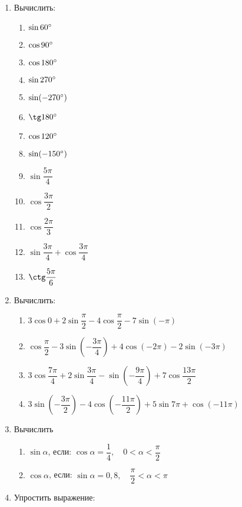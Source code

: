 \documentclass[12pt, a4paper]{article}
\begin{document}
\begin{enumerate}
		\item Вычислить:
		\begin{multicols}{4}
			\begin{enumerate}[label=\asbuk*)]
				\item $\sin 60\degree$
				\item $\cos 90\degree$
				\item $\cos 180\degree$
				\item $\sin 270\degree$
				\item $\sin (-270\degree)$
				\item $\tg 180\degree$
				\item $\cos 120\degree$
				\item $\sin (-150\degree)$
				\item $\sin \dfrac{5\pi}{4}$
				\item $\cos \dfrac{3\pi}{2}$
				\item $\cos \dfrac{2\pi}{3}$
				\item $\sin \dfrac{3\pi}{4} + \cos \dfrac{3\pi}{4}$
				\item $\ctg \dfrac{5\pi}{6}$
			\end{enumerate}
		\end{multicols}
		\item Вычислить:
		\begin{enumerate}[label=\asbuk*)]
			\item $3\cos0+2\sin\dfrac{\pi}{2}-4\cos\dfrac{\pi}{2}-7\sin(-\pi)$
			\item $\cos\dfrac{\pi}{2}-3\sin\left(-\dfrac{3\pi}{4}\right)+4\cos(-2\pi)-2\sin(-3\pi)$
			\item $3\cos\dfrac{7\pi}{4}+2\sin\dfrac{3\pi}{4}-\sin\left(-\dfrac{9\pi}{4}\right)+7\cos\dfrac{13\pi}{2}$
			\item $3\sin\left(-\dfrac{3\pi}{2}\right)-4\cos\left(-\dfrac{11\pi}{2}\right)+5\sin7\pi+\cos(-11\pi)$
		\end{enumerate}
		\item Вычислить
		\begin{multicols}{2}
			\begin{enumerate}[label=\asbuk*)]
				\item $\sin\alpha$, если: $\cos\alpha=\dfrac{1}{4},\quad 0<\alpha<\dfrac{\pi}{2}$
				\item $\cos\alpha$, если: $\sin\alpha=0,8,\quad \dfrac{\pi}{2}<\alpha<\pi$
			\end{enumerate}
		\end{multicols}
		\item Упростить выражение:

\end{enumerate}
\end{document}
